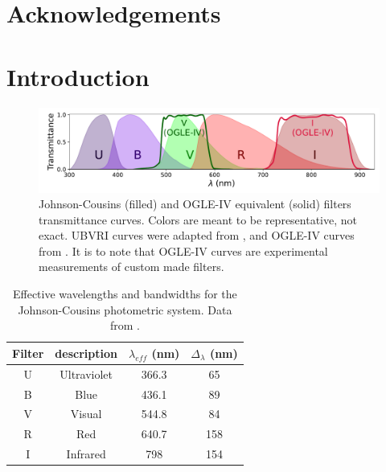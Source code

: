 \documentclass[12pt,letterpaper,oneside]{book}
\begin{document}
\chapter*{Acknowledgements}


\mainmatter

\tableofcontents

\newpage

\listoffigures
\listoftables
\listoflistings

\newpage

\visibleintentfalse

\chapter{Introduction}

\begin{figure}[H]
	\centering
	\includegraphics[width=\textwidth]{img/filters.pdf}
	\caption[Johnson-Cousins and OGLE-IV photometric systems]{
		Johnson-Cousins (filled) and OGLE-IV equivalent (solid) filters transmittance curves. 
		Colors are meant to be representative, not exact. UBVRI curves were adapted from \cite{Bessell2005}, and OGLE-IV curves from \cite{OGLE2015}. 
		It is to note that OGLE-IV curves are experimental measurements of custom made filters.
	}
	\label{fig:filters}
\end{figure}

\begin{table}
	\centering
	\begin{tabular}{c|c||c|c}
		Filter & description & $\lambda_{eff}$ (nm) & $\Delta_{\lambda}$ (nm) \\ \hline\hline
		U & Ultraviolet & 366.3 & 65 \\ 
		B & Blue & 436.1 & 89 \\ 
		V & Visual & 544.8 & 84 \\ 
		R & Red & 640.7 & 158 \\ 
		I & Infrared & 798 & 154
	\end{tabular}
	\caption[Johnson-Cousins effective wavelengths and bandwidths]{
		Effective wavelengths and bandwidths for the Johnson-Cousins photometric system. Data from \cite{Bessell2005}.
		}
	\label{tab:filters}
\end{table}
\end{document}
